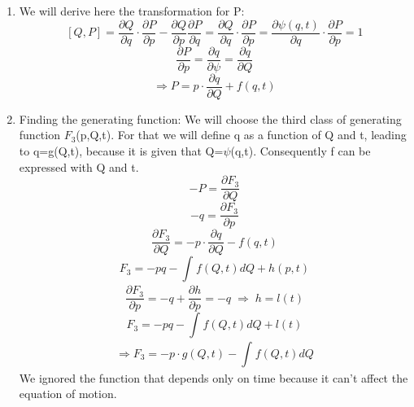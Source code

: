 \documentclass[11pt,fleqn]{article}
\newcommand{\Dn}{\vspace*{3mm}}
\begin{document}
\Dn
\begin{enumerate}
\item We will derive here the transformation for P:
\begin{equation}
\left[Q,P\right]=\frac{\partial Q}{\partial q}\cdot\frac{\partial P}{\partial p}-\frac{\partial Q}{\partial p}\frac{\partial P}{\partial q}=\frac{\partial Q}{\partial q}\cdot\frac{\partial P}{\partial p}=\frac{\partial \psi(q,t)}{\partial q}\cdot\frac{\partial P}{\partial p}=1
\end{equation}
\begin{equation}
\frac{\partial P}{\partial p}=\frac{\partial q}{\partial \psi}=\frac{\partial q}{\partial Q}
\end{equation}
\begin{equation}
\Rightarrow 
\boxed {P=p\cdot\frac{\partial q}{\partial Q}+f(q,t)}
\end{equation}
\item Finding the generating function:
\newline
We will choose the third class of generating function $F_{3}$(p,Q,t). For that we will define q as a function of  Q and t, leading to q=g(Q,t), because it is given that Q=$\psi$(q,t). Consequently f can be expressed with Q and t.
\begin{equation}
-P=\frac{\partial F_{3}}{\partial Q}
\end{equation}
\begin{equation}
-q=\frac{\partial F_{3}}{\partial p}
\end{equation}
\newline
\begin{equation}
\frac{\partial F_{3}}{\partial Q}=-p\cdot\frac{\partial q}{\partial Q}-f(q,t)
\end{equation}
\begin{equation}
F_{3}=-pq- \int_{}^{}f(Q,t)dQ+h(p,t)
\end{equation}
\begin{equation}
\frac{\partial F_{3}}{\partial p}=-q+\frac{\partial h}{\partial p}=-q \; \Rightarrow\; h=l(t)
\end{equation}
\begin{equation}
F_{3}=-pq- \int_{}^{}f(Q,t)dQ+l(t) 
\end{equation}
\begin{equation}
\Rightarrow \boxed{F_{3}=-p\cdot g(Q,t)-\int_{}^{} f(Q,t)dQ}
\end{equation}
We ignored the function that depends only on time because it can't affect the equation of motion.
\newline

\end{enumerate}
\end{document}
